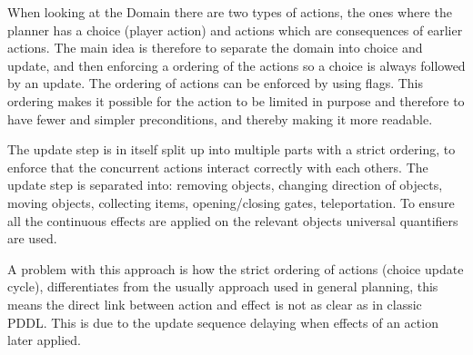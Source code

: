 		When looking at the Domain there are two types of actions, the ones where the planner has a choice (player action) and actions which are consequences of earlier actions. The main idea is therefore to separate the domain into choice and update, and then enforcing a ordering of the actions so a choice is always followed by an update. The ordering of actions can be enforced by using flags. This ordering makes it possible for the action to be limited in purpose and therefore to have fewer and simpler preconditions, and thereby making it more readable.
		
		The update step is in itself split up into multiple parts with a strict ordering, to enforce that the concurrent actions interact correctly with each others. The update step is separated into: removing objects, changing direction of objects, moving objects, collecting items, opening/closing gates, teleportation. To ensure all the continuous effects are applied on the relevant objects universal quantifiers are used. 
		
		A problem with this approach is how the strict ordering of actions (choice update cycle), differentiates from the usually approach used in general planning, this means the direct link between action and effect is not as clear as in classic PDDL. This is due to the update sequence delaying when effects of an action later applied. 
		
	

	
	

